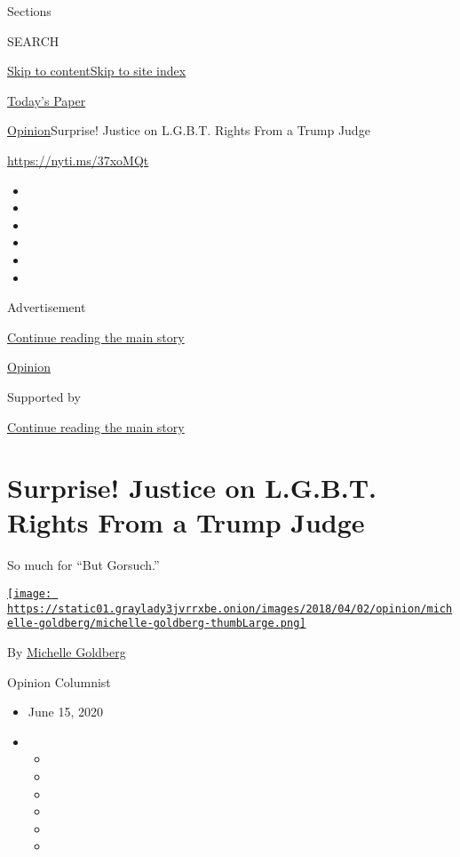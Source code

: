 Sections

SEARCH

\protect\hyperlink{site-content}{Skip to
content}\protect\hyperlink{site-index}{Skip to site index}

\href{https://myaccount.nytimes3xbfgragh.onion/auth/login?response_type=cookie\&client_id=vi}{}

\href{https://www.nytimes3xbfgragh.onion/section/todayspaper}{Today's
Paper}

\href{/section/opinion}{Opinion}\textbar{}Surprise! Justice on L.G.B.T.
Rights From a Trump Judge

\url{https://nyti.ms/37xoMQt}

\begin{itemize}
\item
\item
\item
\item
\item
\item
\end{itemize}

Advertisement

\protect\hyperlink{after-top}{Continue reading the main story}

\href{/section/opinion}{Opinion}

Supported by

\protect\hyperlink{after-sponsor}{Continue reading the main story}

\hypertarget{surprise-justice-on-lgbt-rights-from-a-trump-judge}{%
\section{Surprise! Justice on L.G.B.T. Rights From a Trump
Judge}\label{surprise-justice-on-lgbt-rights-from-a-trump-judge}}

So much for ``But Gorsuch.''

\href{https://www.nytimes3xbfgragh.onion/by/michelle-goldberg}{\texttt{[image: https://static01.graylady3jvrrxbe.onion/images/2018/04/02/opinion/michelle-goldberg/michelle-goldberg-thumbLarge.png]}}

By
\href{https://www.nytimes3xbfgragh.onion/by/michelle-goldberg}{Michelle
Goldberg}

Opinion Columnist

\begin{itemize}
\item
  June 15, 2020
\item
  \begin{itemize}
  \item
  \item
  \item
  \item
  \item
  \item
  \end{itemize}
\end{itemize}

